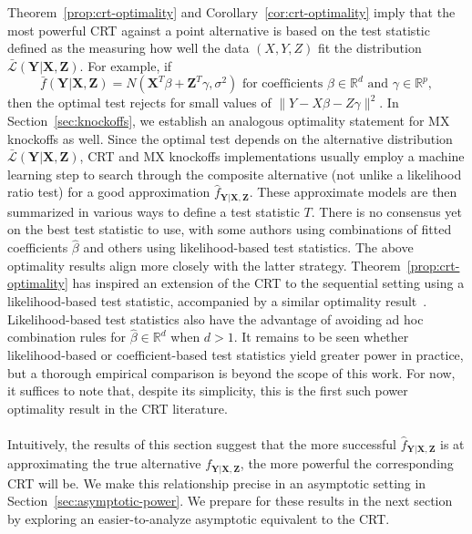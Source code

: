 \documentclass[ejs]{imsart}
\numberwithin{equation}{section}
\theoremstyle{plain}
\theoremstyle{definition}
\theoremstyle{remark}
\newcommand{\prx}{\bm X}
\newcommand{\srx}{X}
\newcommand{\prz}{\bm Z}
\newcommand{\srz}{Z}
\newcommand{\pry}{{\bm Y}}
\newcommand{\sry}{Y}
\begin{document}
Theorem~\ref{prop:crt-optimality} and Corollary~\ref{cor:crt-optimality} imply that the most powerful CRT against a point alternative is based on the test statistic defined as the measuring how well the data $(\srx, \sry, \srz)$ fit the distribution $\bar{\mathcal L}(\pry|\prx,\prz)$. For example, if
\begin{equation}
\bar f(\pry|\prx,\prz) = N(\prx^T\beta + \prz^T \gamma, \sigma^2) \text{ for coefficients } \beta \in \mathbb R^d \text{ and } \gamma \in \mathbb R^p,
\label{linear-model}
\end{equation}
then the optimal test rejects for small values of $\|\sry - \srx \beta - \srz \gamma \|^2$. In Section~\ref{sec:knockoffs}, we establish an analogous optimality statement for MX knockoffs as well. Since the optimal test depends on the alternative distribution $\bar{\mathcal L}(\pry|\prx,\prz)$, CRT and MX knockoffs implementations usually employ a machine learning step to search through the composite alternative (not unlike a likelihood ratio test) for a good approximation $\widehat f_{\pry|\prx,\prz}$. These approximate models are then summarized in various ways to define a test statistic $T$. There is no consensus yet on the best test statistic to use, with some authors \citep{CetL16, SetC17, SetS19} using combinations of fitted coefficients $\widehat \beta$ and others  \citep{Tansey2018, Bates2020} using likelihood-based test statistics. The above optimality results align more closely with the latter strategy. Theorem~\ref{prop:crt-optimality} has inspired an extension of the CRT to the sequential setting using a likelihood-based test statistic, accompanied by a similar optimality result~\citep{Grunwald2022}. Likelihood-based test statistics also have the advantage of avoiding ad hoc combination rules for $\widehat \beta \in \mathbb R^d$ when $d > 1$. It remains to be seen whether likelihood-based or coefficient-based test statistics yield greater power in practice, but a thorough empirical comparison is beyond the scope of this work. For now, it suffices to note that, despite its simplicity, this is the first such power optimality result in the CRT literature.

\paragraph*{}
Intuitively, the results of this section suggest that the more successful $\widehat f_{\pry|\prx,\prz}$ is at approximating the true alternative $f_{\pry|\prx,\prz}$, the more powerful the corresponding CRT will be. We make this relationship precise in an asymptotic setting in Section~\ref{sec:asymptotic-power}. We prepare for these results in the next section by exploring an easier-to-analyze asymptotic equivalent to the CRT.
\end{document}
